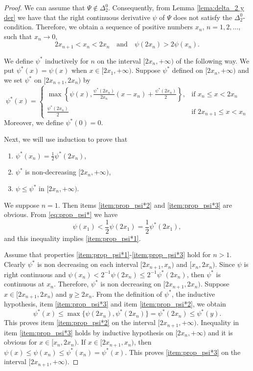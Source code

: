 \documentclass[twoside]{elsarticle}
\theoremstyle{remark}
\renewcommand{\leq}{\leqslant}
\renewcommand{\geq}{\geqslant}
\begin{document}
\begin{proof} We can assume that $\Psi \notin \Delta_2^0$.
Consequently, from Lemma \ref{lema:delta_2 y der} we have that the right continuous derivative $\psi$ of $\Psi$ does not satisfy the $\Delta_2^0$-condition. 
Therefore, we obtain a sequence of positive numbers $x_n$, $n=1,2,\ldots$,  such that $x_n\to 0$, 
\begin{equation}\label{eq:prop_psi*}2x_{n+1}<x_n<2x_n\quad\text{and}\quad \psi(2x_n)> 2\psi(x_n).
 \end{equation}

We define $\psi^*$ inductively for $n$ on the interval $[2x_n,+\infty)$ of the following way.   
We put $\psi^*(x)=\psi(x)$ when  $x\in[ 2x_1,+\infty)$. 
Suppose $\psi^*$ defined on $[2x_n,+\infty)$ and we set $\psi^*$ on $[2x_{n+1},2x_n)$ by
\[
 \psi^*(x)=\left\{
\begin{array}{cc}
  \max\left\{\psi(x),\frac{\psi^*(2x_n)}{2x_n}(x-x_n)+\frac{ \psi^*(2x_n)}{2}\right\},& \text{if } x_n\leq x<2x_n\\
   \frac{\psi^*(2x_n)}{2}& \text{if }2x_{n+1} \leq x<x_n
  \end{array}
\right.
\]
Moreover, we define $\psi^*(0)=0$. 


Next, we will use induction  to prove that
\begin{enumerate}
 \item\label{item:prop_psi*1} $\psi^*(x_n)=\frac12\psi^*(2x_n)$,
 \item\label{item:prop_psi*2}  $\psi^*$ is non-decreasing $[2x_{n},+\infty)$,
 \item\label{item:prop_psi*3}   $\psi\leq \psi^*$ in  $[2x_{n},+\infty)$.
\end{enumerate}

We suppose $n=1$. Then items \ref{item:prop_psi*2} and \ref{item:prop_psi*3} are obvious. From \eqref{eq:prop_psi*} we have
\[\psi(x_1)<\frac12\psi(2x_1)=\frac12\psi^*(2x_1),\]
and this inequality implies \ref{item:prop_psi*1}.

Assume that properties \ref{item:prop_psi*1}-\ref{item:prop_psi*3} hold for $n>1$.  Clearly $\psi^*$ is non decreasing on each interval $[2x_{n+1},x_n)$ and $[x_n,2x_n)$. Since $\psi$ is right continuous and $\psi(x_n)<2^{-1}\psi(2x_n)\leq 2^{-1}\psi^*(2x_n)$, then $\psi^*$ is continuous at $x_n$. Therefore, $\psi^*$ is non decreasing on $[2x_{n+1},2x_n)$. Suppose $x\in[2x_{n+1},2x_n)$ and $y\geq 2x_n$.  From the definition of $\psi^*$, the inductive hypothesis, item \ref{item:prop_psi*3} and item \ref{item:prop_psi*2}, we obtain
%
\[\psi^*(x)\leq\max\{\psi(2x_n),\psi^*(2x_n)\}=\psi^*(2x_n)\leq\psi^*(y).\]
%
This proves item \ref{item:prop_psi*2} on the interval $[2x_{n+1},+\infty)$.
Inequality in item \ref{item:prop_psi*3} holds by inductive hypothesis on $[2x_n,+\infty)$ 
and it is obvious for  $x\in[x_n,2x_n)$. 
If $ x\in[2x_{n+1},x_n)$, then $\psi(x)\leq\psi(x_n)\leq\psi^*(x_n)=\psi^*(x)$. 
This proves  \ref{item:prop_psi*3} on the interval $[2x_{n+1},+\infty)$.


\end{proof}
\end{document}
